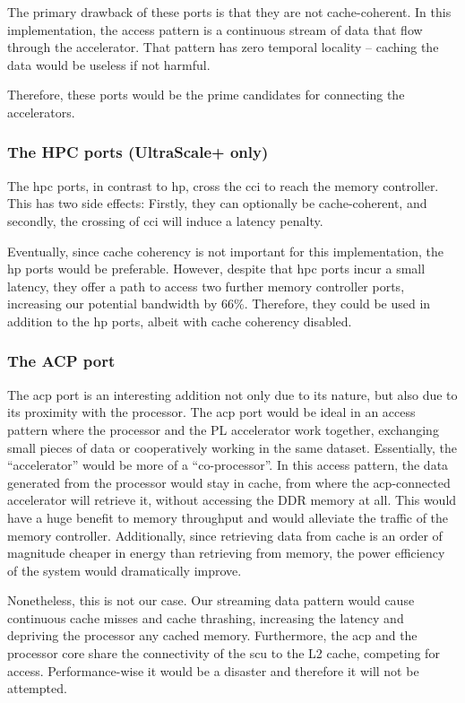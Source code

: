 The primary drawback of these ports is that they are not cache-coherent.
In this implementation, the access pattern is a continuous stream of data
that flow through the accelerator. That pattern has zero temporal locality --
caching the data would be useless if not harmful.

Therefore, these ports would be the prime candidates for connecting
the accelerators.

\subsubsection{The HPC ports (UltraScale+ only)}

The \gls{hpc} ports, in contrast to \gls{hp}, cross the \gls{cci} to reach
the memory controller. This has two side effects: Firstly, they can
optionally be cache-coherent, and secondly, the crossing of \gls{cci}
will induce a latency penalty.

Eventually, since cache coherency is not important for this implementation,
the \gls{hp} ports would be preferable. However, despite that \gls{hpc} ports
incur a small latency, they offer a path to access two further memory controller
ports, increasing our potential bandwidth by 66\%.
Therefore, they could be used in addition to the \gls{hp} ports, albeit with
cache coherency disabled.

\subsubsection{The ACP port}

The \gls{acp} port is an interesting addition not only due to its 
nature, but also due to its proximity with the processor.
The \gls{acp} port would be ideal in an access pattern where the processor and the PL accelerator
work together, exchanging small pieces of data or cooperatively working in the same dataset.
Essentially, the ``accelerator'' would be more of a ``co-processor''.
In this access pattern, the data generated from the processor would stay in cache, from where
the \gls{acp}-connected accelerator will retrieve it, without accessing the DDR memory at all.
This would have a huge benefit to memory throughput and
would alleviate the traffic of the memory controller. Additionally, since retrieving data
from cache is an order of magnitude cheaper in energy than retrieving from memory,
the power efficiency of the system would dramatically improve.

Nonetheless, this is not our case. Our streaming data pattern would
cause continuous cache misses and cache thrashing,
increasing the latency and depriving the processor any cached memory.
Furthermore, the \gls{acp} and the processor core share the connectivity
of the \gls{scu} to the L2 cache, competing for access.
Performance-wise it would be a disaster and therefore it will not be attempted.


